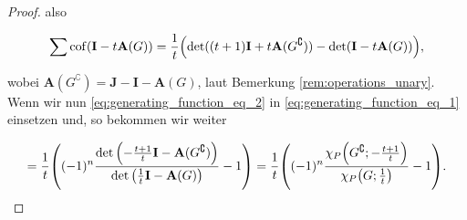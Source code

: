 \begin{proof}
                also

                \begin{align} \label{eq:generating_function_eq_2}
                    \sum \operatorname{cof}(\mathbf I - t \mathbf A(G))
                    =
                    \frac{1}{t}
                    {\left ( 
                        \det((t+1) \mathbf I + t \mathbf A(G^\complement))
                        -
                        \det(\mathbf I - t \mathbf A(G))
                     \right )},
                \end{align}

                wobei $\mathbf A(G^\complement) = \mathbf J - \mathbf I - \mathbf A(G)$, laut Bemerkung \ref{rem:operations_unary}.
                Wenn wir nun \eqref{eq:generating_function_eq_2} in \eqref{eq:generating_function_eq_1} einsetzen und, so bekommen wir weiter

                \begin{align*}
                    =
                    \frac{1}{t}
                    {\left ( 
                        (-1)^n
                        \frac
                        {
                            \det
                            {\left ( 
                                -\frac{t+1}{t} \mathbf I - \mathbf A(G^\complement)
                             \right )}
                        }{
                            \det
                            {\left ( 
                                \frac{1}{t} \mathbf I - \mathbf A(G)
                             \right )}
                        }
                        -
                        1
                     \right )}
                    =
                    \frac{1}{t}
                    {\left ( 
                        (-1)^n
                        \frac
                        {
                            \chi_P
                            {\left ( 
                                G^\complement;
                                -\frac{t+1}{t}
                             \right )}
                        }{
                            \chi_P
                            {\left ( 
                                G;
                                \frac{1}{t}
                             \right )}
                        }
                        -
                        1
                     \right )}.
                \end{align*}

            \end{proof}

